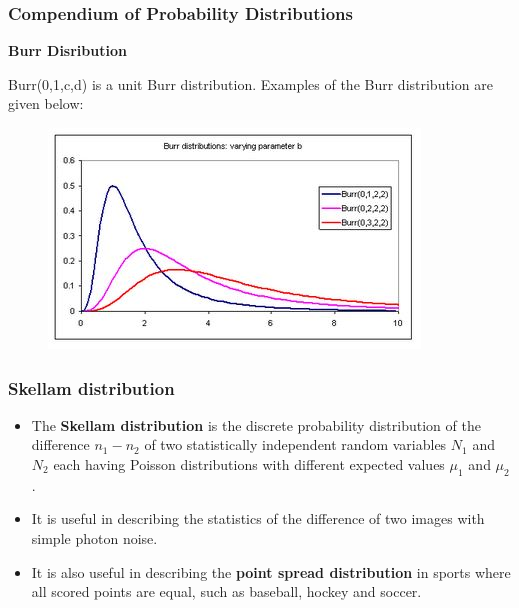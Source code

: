 \documentclass[MAIN.tex]{subfiles}
\begin{document}
\begin{frame}
	\frametitle{Compendium of Probability Distributions}
	\textbf{Burr Disribution}

Burr(0,1,c,d) is a unit Burr distribution. 
Examples of the Burr distribution are given below:

\begin{figure}
\centering
\includegraphics[width=0.7\linewidth]{images/burrdistribution}
\caption{}
\label{fig:burrdistribution}
\end{figure}


\end{frame}
\begin{frame}
\frametitle{Skellam distribution}
\large
\begin{itemize}

\item The \textbf{Skellam distribution} is the discrete probability distribution of the difference $n_1-n_2$ of two statistically independent random variables $N_1$ and $N_2$ each having Poisson distributions with different expected values $\mu_1$ and $\mu_2$.
\item It is useful in describing the statistics of the difference of two images with simple photon noise.
\item It is also useful in describing the \textbf{point spread distribution} in sports where all scored points are equal, such as baseball, hockey and soccer.
\end{itemize}
\end{frame}
\end{document}
